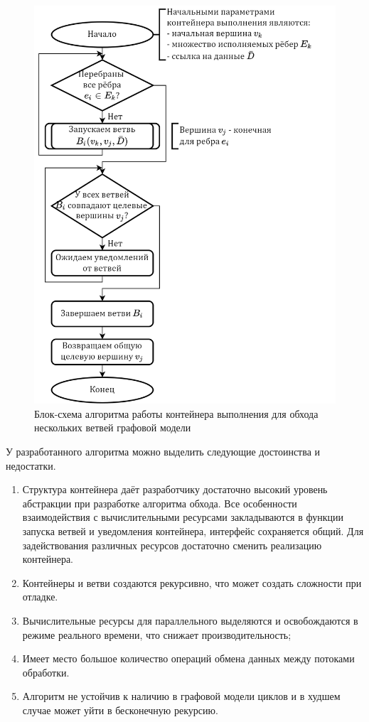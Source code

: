 \begin{figure}[H]
	\centering
	\includegraphics[height=0.6\textheight]{ResearchNotes/rndhpc_not_par_2022_01_22/flowchart.executionContainer.png}
	\caption{Блок-схема алгоритма работы контейнера выполнения для обхода нескольких ветвей графовой модели}
	\label{fig:comsdk_container}
\end{figure}

У разработанного алгоритма можно выделить следующие достоинства и недостатки.
\begin{enumerate}
	\item Структура контейнера даёт разработчику достаточно высокий уровень абстракции при разработке алгоритма обхода. Все особенности взаимодействия с вычислительными ресурсами закладываются в функции запуска ветвей и уведомления контейнера, интерфейс сохраняется общий. Для задействования различных ресурсов достаточно сменить реализацию контейнера.
	\item Контейнеры и ветви создаются рекурсивно, что может создать сложности при отладке.
	\item Вычислительные ресурсы для параллельного выделяются и освобождаются в режиме реального времени, что снижает производительность;
	\item Имеет место большое количество операций обмена данных между потоками обработки.
	\item Алгоритм не устойчив к наличию в графовой модели циклов и в худшем случае может уйти в бесконечную рекурсию.
\end{enumerate}
\noteattributes{}
